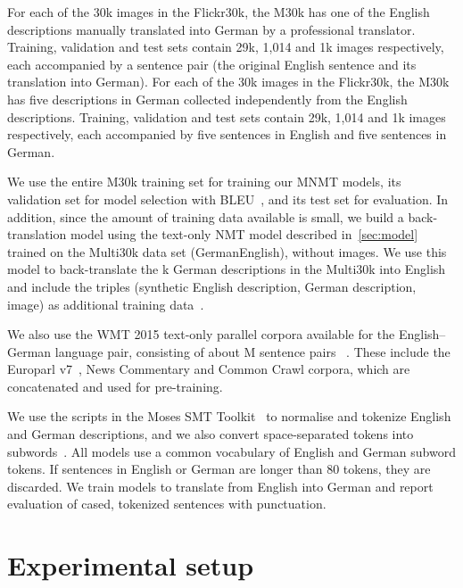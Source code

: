 \documentclass[11pt]{article}
\begin{document}
For each of the 30k images in the Flickr30k, the M30k has one of the English descriptions manually translated into German by a professional translator. Training, validation and test sets contain 29k, 1,014 and 1k images respectively, each accompanied by a sentence pair (the original English sentence and its translation into German).
For each of the 30k images in the Flickr30k, the M30k has five descriptions in German collected independently from the English descriptions. Training, validation and test sets contain 29k, 1,014 and 1k images respectively, each accompanied by five sentences in English and five sentences in German.

We use the entire M30k training set for training our MNMT models, its validation set for model selection with BLEU~\cite{Papinenietal2002}, and its test set for evaluation.
In addition, since the amount of training data available is small, we build a back-translation model using the text-only NMT model described in~\cref{sec:model} trained on the Multi30k data set (GermanEnglish), without images.
We use this model to back-translate the k German descriptions in the Multi30k into English and include the triples (synthetic English description, German description, image) as additional training data~\cite{Sennrichetal2016a}.

We also use the WMT 2015 text-only parallel corpora available for the English--German language pair, consisting of about M sentence pairs ~\cite{Bojaretal2015}.
These include the Europarl v7~\cite{Koehn2005}, News Commentary and Common Crawl corpora, which are concatenated and used for pre-training.

We use the scripts in the Moses SMT Toolkit~\cite{Koehnetal2007} to normalise and tokenize English and German descriptions, and we also convert space-separated tokens into subwords~\cite{Sennrichetal2016}.
All models use a common vocabulary of  English and  German subword tokens.
If sentences in English or German are longer than 80 tokens, they are discarded.
We train models to translate from English into German and report evaluation of cased, tokenized sentences with punctuation.


\section{Experimental setup}
\label{sec:experiments}
\end{document}
